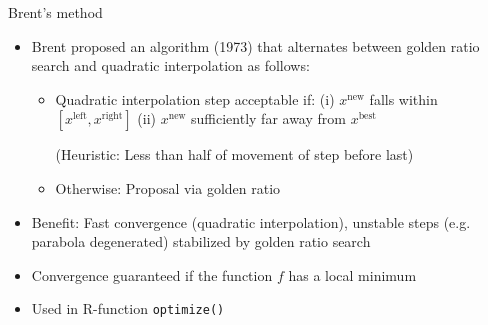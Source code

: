 \documentclass[11pt,compress,t,notes=noshow, xcolor=table]{beamer}
\begin{document}
\begin{vbframe}{Brent's method}

\begin{itemize}
  \item Brent proposed an algorithm (1973) that alternates between golden ratio search and quadratic interpolation as follows: 
  \begin{itemize}
    \item Quadratic interpolation step acceptable if: (i) $x^{\text{new}}$ falls within $[x^{\text{left}}, x^{\text{right}}]$ (ii) $x^{\text{new}}$ sufficiently far away from  $x^{\text{best}}$ \\
    \begin{footnotesize}(Heuristic: Less than half of movement of step before last) 
    \end{footnotesize}
    \item Otherwise: Proposal via golden ratio
  \end{itemize}
  \item Benefit: Fast convergence (quadratic interpolation), unstable steps (e.g. parabola degenerated) stabilized by golden ratio search
  \item Convergence guaranteed if the function $f$ has a local minimum
  \item Used in R-function \texttt{optimize()}
\end{itemize}


\end{vbframe}
\end{document}
